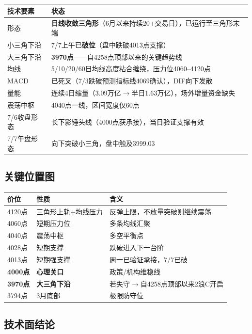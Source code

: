 \documentclass[a4paper,11pt,fontset=none]{ctexart}
\begin{document}
\begin{exhibitbox}
\begin{tabularx}{\textwidth}{L{3.5cm}X}
\toprule
\textbf{技术要素} & \textbf{状态} \\
\midrule
形态 & \textbf{日线收敛三角形}（6月以来持续20+交易日），已运行至三角形末端 \\
小三角下沿 & 7/7上午已\textbf{破位}（盘中跌破4013点支撑） \\
大三角下沿 & \textbf{3970点}——自4258点顶部以来的关键趋势线 \\
均线 & 5/10/20/60日均线高度粘合缠绕，压力位4060--4120点 \\
MACD & 已死叉（7/3跌破预测指标线4069确认），DIF向下发散 \\
量能 & 连续4日缩量（3.09万亿$\to$半日1.63万亿），场外增量资金缺失 \\
震荡中枢 & 4040点一线，区间宽度仅60点 \\
7/6收盘形态 & 长下影锤头线（4000点获承接），当日验证支撑有效 \\
7/7午盘形态 & 向下突破小三角，盘中触及3999.03 \\
\bottomrule
\end{tabularx}
\end{exhibitbox}

\subsection*{关键位置图}

\begin{tabularx}{\textwidth}{L{3cm}L{2cm}X}
\toprule
\textbf{价位} & \textbf{性质} & \textbf{含义} \\
\midrule
4120点 & 三角形上轨+均线压力 & 反弹上限，不放量突破则继续震荡 \\
4060点 & 短期压力位 & 多条均线汇聚 \\
4040点 & 震荡中枢 & 多空平衡点 \\
4028点 & 短期支撑 & 跌破进入下一台阶 \\
4013点 & 短期强支撑 & 周一已验证承接，7/7已破 \\
\textbf{4000点} & \textbf{心理关口} & 政策/机构维稳线 \\
\textbf{3970点} & \textbf{大三角下沿} & 若失守$\to$自4258点顶部以来2浪C开启 \\
3794点 & 3月底部 & 极限防守位 \\
\bottomrule
\end{tabularx}

\subsection*{技术面结论}
\end{document}
